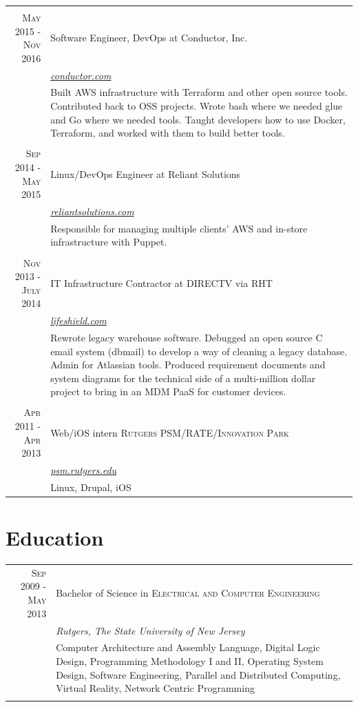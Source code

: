 \documentclass[a4paper, 10pt, onepage]{article} %
\begin{document}
\begin{tabular}{r|p{10cm}}
\multicolumn{2}{c}{}\\
\textsc{May 2015 - Nov 2016} & {Software Engineer, DevOps at Conductor, Inc.}\\
&\small\emph{\href{https://conductor.com}{conductor.com}}\\
&\footnotesize{Built AWS infrastructure with Terraform and other open source tools. Contributed back to OSS projects. Wrote bash where we needed glue and Go where we needed tools. Taught developers how to use Docker, Terraform, and worked with them to build better tools.}\\

\multicolumn{2}{c}{}\\
\textsc{Sep 2014 - May 2015} & {Linux/DevOps Engineer at Reliant Solutions}\\
&\small\emph{\href{https://reliantsolutions.com}{reliantsolutions.com}}\\
&\footnotesize{Responsible for managing multiple clients' AWS and in-store infrastructure with Puppet.}\\

\multicolumn{2}{c}{}\\
\textsc{Nov 2013 - July 2014} & {IT Infrastructure Contractor at DIRECTV via RHT}\\
&\small\emph{\href{https://lifeshield.com}{lifeshield.com}}\\
&\footnotesize{Rewrote legacy warehouse software. Debugged an open source C email system (dbmail) to develop a way of cleaning a legacy database. Admin for Atlassian tools. Produced requirement documents and system diagrams for the technical side of a multi-million dollar project to bring in an MDM PaaS for customer devices.}\\

\multicolumn{2}{c}{}\\
\textsc{Apr 2011 - Apr 2013} & Web/iOS intern \textsc{Rutgers PSM/RATE/Innovation Park}\\
& \small\emph{\href{https://psm.rutgers.edu}{psm.rutgers.edu}}\\
& \footnotesize{Linux, Drupal, iOS}\\
\end{tabular}

\section{Education}
\begin{tabular}{r|p{10cm}}
\textsc{Sep 2009 - May 2013} & Bachelor of Science in \textsc{Electrical and Computer Engineering}\\
& \small\emph{Rutgers, The State University of New Jersey}\\
& \footnotesize{Computer Architecture and Assembly Language, Digital Logic Design, Programming Methodology I and II, Operating System Design, Software Engineering, Parallel and Distributed Computing, Virtual Reality, Network Centric Programming}\\
\multicolumn{2}{c}{}\\
\end{tabular}
\end{document}
